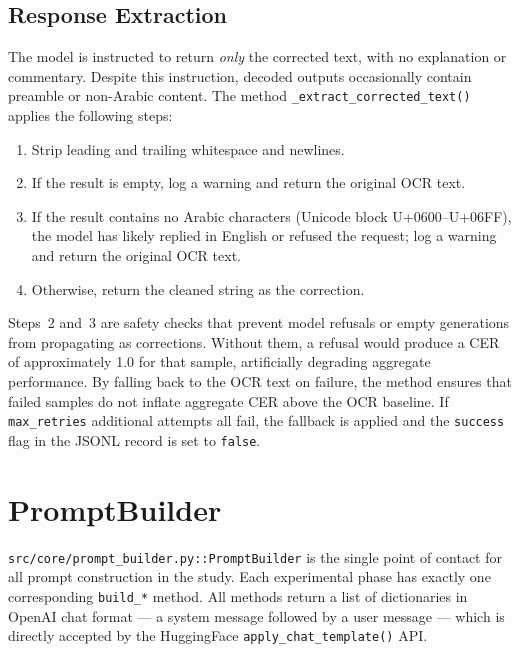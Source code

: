 \subsection{Response Extraction}
\label{subsec:extraction}

The model is instructed to return \emph{only} the corrected text, with no
explanation or commentary.
Despite this instruction, decoded outputs occasionally contain preamble or
non-Arabic content.
The method \texttt{\_extract\_corrected\_text()} applies the following steps:

\begin{enumerate}
  \item Strip leading and trailing whitespace and newlines.
  \item If the result is empty, log a warning and return the original OCR text.
  \item If the result contains no Arabic characters (Unicode block U+0600--U+06FF),
        the model has likely replied in English or refused the request; log a
        warning and return the original OCR text.
  \item Otherwise, return the cleaned string as the correction.
\end{enumerate}

\noindent
Steps~2 and~3 are safety checks that prevent model refusals or empty generations
from propagating as corrections.
Without them, a refusal would produce a CER of approximately 1.0 for that sample,
artificially degrading aggregate performance.
By falling back to the OCR text on failure, the method ensures that failed samples
do not inflate aggregate CER above the OCR baseline.
If \texttt{max\_retries} additional attempts all fail, the fallback is applied and
the \texttt{success} flag in the JSONL record is set to \texttt{false}.

\section{PromptBuilder}
\label{sec:promptbuilder}

\texttt{src/core/prompt\_builder.py::PromptBuilder} is the single point of contact
for all prompt construction in the study.
Each experimental phase has exactly one corresponding \texttt{build\_*} method.
All methods return a list of dictionaries in OpenAI chat format --- a system
message followed by a user message --- which is directly accepted by the HuggingFace
\texttt{apply\_chat\_template()} API.

